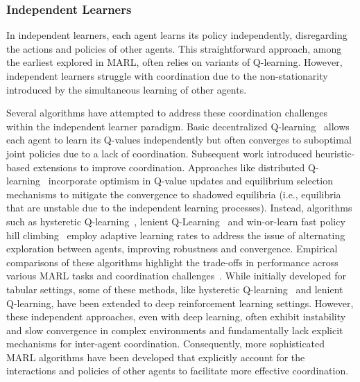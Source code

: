 \documentclass[sigconf]{acmart}
\begin{document}
\subsubsection{Independent Learners}
In independent learners, each agent learns its policy independently, disregarding the actions and policies of other agents. 
This straightforward approach, among the earliest explored in MARL, often relies on variants of Q-learning. 
However, independent learners struggle with coordination due to the non-stationarity introduced by the simultaneous learning of other agents.

Several algorithms have attempted to address these coordination challenges within the independent learner paradigm. 
Basic decentralized Q-learning~\cite{tan1993multi} allows each agent to learn its Q-values independently but often converges to suboptimal joint policies due to a lack of coordination. 
Subsequent work introduced heuristic-based extensions to improve coordination.
Approaches like distributed Q-learning~\cite{lauer2000algorithm} incorporate optimism in Q-value updates and equilibrium selection mechanisms to mitigate the convergence to shadowed equilibria (i.e., equilibria that are unstable due to the independent learning processes). 
Instead, algorithms such as hysteretic Q-learning~\cite{matignon2007hysteretic}, lenient Q-Learning~\cite{bloembergen2010lenient} and win-or-learn fast policy hill climbing~\cite{bowling2002multiagent} employ adaptive learning rates to address the issue of alternating exploration between agents, improving robustness and convergence.
%
Empirical comparisons of these algorithms highlight the trade-offs in performance across various MARL tasks and coordination challenges~\cite{matignon2012independent}. 
While initially developed for tabular settings, some of these methods, like hysteretic Q-learning~\cite{palmer2017lenient} and lenient Q-learning, have been extended to deep reinforcement learning settings. 
However, these independent approaches, even with deep learning, often exhibit instability and slow convergence in complex environments and fundamentally lack explicit mechanisms for inter-agent coordination. 
Consequently, more sophisticated MARL algorithms have been developed that explicitly account for the interactions and policies of other agents to facilitate more effective coordination.
\end{document}
